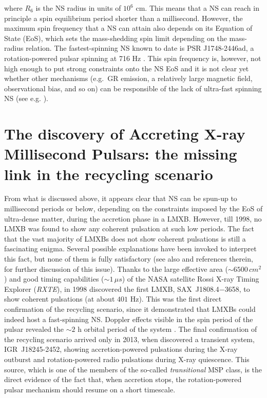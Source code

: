 \documentclass[graybox]{svmult}
\def \rxte {{\em RXTE\xspace}}
\def \saxj{{\rm SAX~J1808.4$-$3658\xspace}}
\begin{document}
where $R_6$ is the NS radius in units of $10^6$ cm. This means that a NS can reach in principle a spin equilibrium period shorter than a millisecond. However, the maximum spin frequency that a NS can attain also depends on its Equation of State (EoS), which sets the mass-shedding spin limit depending on the mass-radius relation. The fastest-spinning NS known to date is PSR J1748-2446ad, a rotation-powered pulsar spinning at 716 Hz \cite{Hessels2006}. This spin frequency is, however, not high enough to put strong constraints onto the NS EoS and it is not clear yet whether other mechanisms (e.g.\ GR emission, a relatively large magnetic field, observational bias, and so on) can be responsible of the lack of ultra-fast spinning NS (see e.g. \cite{Burderi2001}). 


\section{The discovery of Accreting X-ray Millisecond Pulsars: the missing link in the recycling scenario}

From what is discussed above, it appears clear that NS can be spun-up to millisecond periods or below, depending on the constraints imposed by the EoS of ultra-dense matter, during the accretion phase in a LMXB. However, till 1998, no LMXB was found to show any coherent pulsation at such low periods. The fact that the vast majority of LMXBs does not show coherent pulsations is still a fascinating enigma. Several possible explanations have been invoked to interpret this fact, but none of them is fully satisfactory (see also \cite{Patruno2012} and references therein, for further discussion of this issue). Thanks to the large effective area ($\sim 6500\, cm^2$) and good timing capabilities ($\sim 1\, \mu s$) of the NASA satellite Rossi X-ray Timing Explorer (\rxte{}), in 1998 \cite{Wijnands1998} discovered the first LMXB, \saxj, to show coherent pulsations (at about $401$ Hz). This was the first direct confirmation of the recycling scenario, since it demonstrated that LMXBs could indeed host a fast-spinning NS. Doppler effects visible in the spin period of the pulsar revealed the $\sim 2$ h orbital period of the system  \cite{Chakrabarty1998}. 
The final confirmation of the recycling scenario arrived only in 2013, when \cite{Papitto2013b} discovered a transient system, IGR~J18245-2452, showing accretion-powered pulsations during the X-ray outburst and rotation-powered radio pulsations during X-ray quiescence. This source, which is one of the members of the so-called {\it transitional} MSP class, is the direct evidence of the fact that, when accretion stops, the rotation-powered pulsar mechanism should resume on a short timescale.
\end{document}
